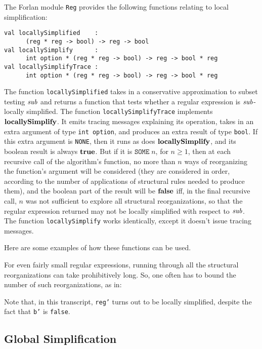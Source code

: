 The Forlan module \texttt{Reg} provides the following functions
relating to local simplification:
\begin{verbatim}
val locallySimplified    :
      (reg * reg -> bool) -> reg -> bool
val locallySimplify      :
      int option * (reg * reg -> bool) -> reg -> bool * reg
val locallySimplifyTrace :
      int option * (reg * reg -> bool) -> reg -> bool * reg
\end{verbatim}
%
%
%
The function \texttt{locallySimplified} takes in a conservative
approximation to subset testing ${\it sub}$ and returns a function that
tests whether a regular expression is ${\it sub}$-locally simplified.  The
function \texttt{locallySimplifyTrace} implements $\mathbf{locallySimplify}$.
It emits tracing messages explaining its operation, takes in an extra
argument of type \texttt{int~option}, and produces an extra result of
type \texttt{bool}.  If this extra argument is \texttt{NONE}, then it
runs as does $\mathbf{locallySimplify}$, and its boolean result is always
$\mathbf{true}$.  But if it is $\mathtt{SOME}\;n$, for $n\geq 1$, then at each
recursive call of the algorithm's function, no more than $n$ ways of
reorganizing the function's argument will be considered (they are
considered in order, according to the number of applications of
structural rules needed to produce them), and the boolean part of the
result will be $\mathbf{false}$ iff, in the final recursive call, $n$ was not
sufficient to explore all structural reorganizations, so that the
regular expression returned may not be locally simplified with respect
to ${\it sub}$.  The function \texttt{locallySimplify} works identically,
except it doesn't issue tracing messages.

Here are some examples of how these functions can be used.

For even fairly small regular expressions, running through all the
structural reorganizations can take prohibitively long.  So, one
often has to bound the number of such reorganizations, as in:

Note that, in this transcript, \texttt{reg'} turns out to be
locally simplified, despite the fact that \texttt{b'} is \texttt{false}.
%
%
%

\subsection*{Global Simplification}

